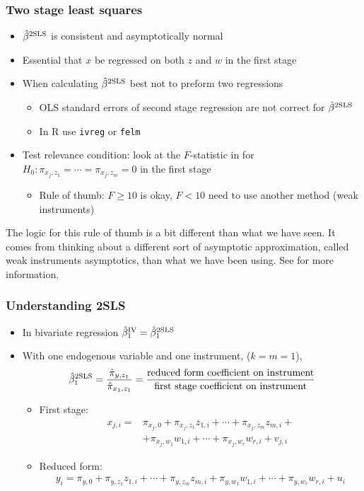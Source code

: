 \begin{frame}[allowframebreaks]\frametitle{Two stage least squares}
  \begin{itemize}
  \item ${\hat{\beta}^{\mathrm{2SLS}}}$ is consistent and asymptotically normal
  \item Essential that $x$ be regressed on both $z$ and $w$ in the
    first stage
  \item When calculating ${\hat{\beta}^{\mathrm{2SLS}}}$ best not to preform two
    regressions 
    \begin{itemize}
    \item OLS standard errors of second stage regression are not
      correct for ${\hat{\beta}^{\mathrm{2SLS}}}$
    \item In R use {\texttt{ivreg}} or {\texttt{felm}}
    \end{itemize}
  \item Test relevance condition: look at the
    $F$-statistic in for $H_0: \pi_{x_j,z_1} = \cdots = \pi_{x_j,z_m}
    = 0$ in the first stage
    \begin{itemize}
    \item Rule of thumb: $F \geq 10$ is okay, $F < 10$ need to use
      another method (weak instruments)       
    \end{itemize}
  \end{itemize}
\end{frame}
The logic for this rule of thumb is a bit different than what we have
seen. It comes from thinking about a different sort of asymptotic
approximation, called weak instruments asymptotics, than what we have
been using. See \cite{stockWrightYogo2002} for more information.


\begin{frame}[allowframebreaks]\frametitle{Understanding 2SLS} 
  \begin{itemize}
  \item In bivariate regression ${\hat{\beta}^{\mathrm{IV}}}_1 = {\hat{\beta}^{\mathrm{2SLS}}}_1$
  \item With one endogenous variable and one instrument, ($k=m=1$), 
    \[ {\hat{\beta}^{\mathrm{2SLS}}}_1 = \frac{\hat{\pi}_{y,z_1}} {\hat{\pi}_{x_1,z_1}} =
    \frac{\text{reduced form coefficient on instrument}}
    {\text{first stage coefficient on instrument}}\]
    \begin{itemize}
    \item First stage:
      {\footnotesize{
      \begin{align*}
        {x}_{j,i} = & {\pi}_{x_j,0} + {\pi}_{x_j,z_1} z_{1,i} +
        \cdots + {\pi}_{x_j,z_m} z_{m,i} + \\ & +{\pi}_{x_j,w_1} w_{1,i} +
        \cdots + {\pi}_{x_j,w_r} w_{r,i}  + v_{j,i}
      \end{align*}
      }}
    \item Reduced form: 
      {\footnotesize{
      \begin{align*}
        y_i = {\pi}_{y,0} + {\pi}_{y,z_1} z_{1,i} +
        \cdots + {\pi}_{y,z_m} z_{m,i} + {\pi}_{y,w_1} w_{1,i} +
        \cdots + {\pi}_{y,w_r} w_{r,i}  + u_i
      \end{align*}
    }}
    \end{itemize}
  \end{itemize}
\end{frame}

